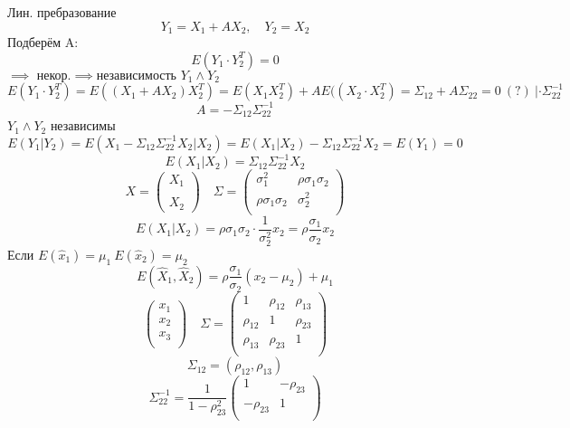 \documentclass[a4paper]{article}
\begin{document}
Лин. пребразование
\[
    Y_1 = X_1 + A X_2, \quad Y_2 = X_2
\]
Подберём A:
\begin{equation}
    E(Y_1 \cdot Y_2^{T}) = 0
\end{equation}
$ \implies \text{ некор.} \implies \text{независимость } Y_1 \land Y_2 $ 
\[
    E(Y_1 \cdot Y_2^{T}) = E((X_1 + A X_2) X_2^{T}) = E(X_1 X_2^{T}) + A
    E((X_2 \cdot X_2^{T}) = \Sigma_{12} + A \Sigma_{22} = 0 \ (?) \ | \cdot \Sigma_{22}^{-1}
\]
\[
    A = -\Sigma_{12}\Sigma_{22}^{-1}
\]
$ Y_1 \land Y_2 $ независимы
\[
    E(Y_1 | Y_2) = E(X_1 - \Sigma_{12}\Sigma_{22}^{-1}X_2 | X_2) = 
    E(X_1 | X_2) - \Sigma_{12}\Sigma_{22}^{-1}X_2 = E(Y_1) = 0
\]
\[
    E(X_1 | X_2) = \Sigma_{12}\Sigma_{22}^{-1}X_2
\]
\[
    X = \begin{pmatrix}
    X_1\\
    \\
    X_2
    
    \end{pmatrix}
    \quad \Sigma = \begin{pmatrix}
    \sigma_1^2 & \rho \sigma_1\sigma_2\\
    \rho\sigma_1\sigma_2 & \sigma_2^2\\
    
    \end{pmatrix}
\]
\[
    E(X_1|X_2) = \rho\sigma_1\sigma_2 \cdot \frac{1}{\sigma_2^2} x_2 = \rho
    \frac{\sigma_1}{\sigma_2} x_2
\]
Если $ E(\hat{x}_1) = \mu_1 \ E(\hat{x}_2) = \mu_2 $ 
\[
    E(\hat{X}_1, \hat{X}_2) = \rho \frac{\sigma_1}{\sigma_2} (x_2 - \mu_2) + 
    \mu_1
\]
\[
    \begin{pmatrix}
    x_1\\
    x_2\\
    x_3\\
    
    \end{pmatrix}
    \quad \Sigma = \begin{pmatrix}
        1 & \rho_{12} & \rho_{13}\\
    \rho_{12} & 1 & \rho_{23}\\
    \rho_{13} & \rho_{23} & 1\\
    
    \end{pmatrix}
\]
\[
    \Sigma_{12} = (\rho_{12}, \rho_{13})
\]
\[
    \Sigma_{22}^{-1} = \frac{1}{1 - \rho_{23}^2} \begin{pmatrix}
    1 & -\rho_{23}\\
    -\rho_{23} & 1\\
    
    \end{pmatrix}
\]
\end{document}
